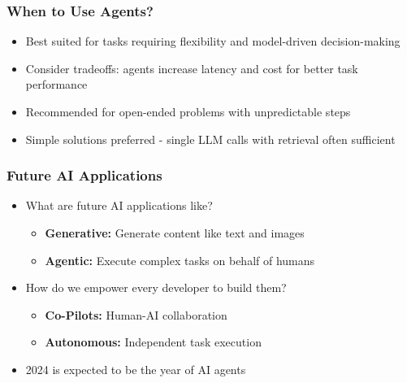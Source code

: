 \begin{frame}[fragile]\frametitle{When to Use Agents?}
    \begin{itemize}
        \item Best suited for tasks requiring flexibility and model-driven decision-making
        \item Consider tradeoffs: agents increase latency and cost for better task performance
        \item Recommended for open-ended problems with unpredictable steps
        \item Simple solutions preferred - single LLM calls with retrieval often sufficient
    \end{itemize}
\end{frame}

\begin{frame}[fragile]\frametitle{Future AI Applications}
\begin{itemize}
    \item What are future AI applications like?
    \begin{itemize}
        \item \textbf{Generative:} Generate content like text and images
        \item \textbf{Agentic:} Execute complex tasks on behalf of humans
    \end{itemize}
    \item How do we empower every developer to build them?
    \begin{itemize}
        \item \textbf{Co-Pilots:} Human-AI collaboration
        \item \textbf{Autonomous:} Independent task execution
    \end{itemize}
    \item 2024 is expected to be the year of AI agents
\end{itemize}
\end{frame}


